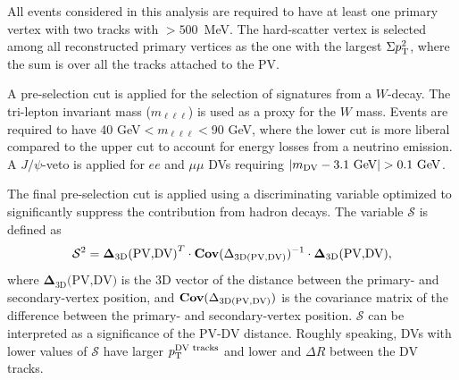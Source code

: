 All events considered in this analysis are required to have at least one primary vertex with two tracks with \pT$>500$~MeV. The hard-scatter vertex is selected among all reconstructed primary vertices as the one with the largest $\Sigma p_\mathrm{T}^2$, where the sum is over all the tracks attached to the PV.

A pre-selection cut is applied for the selection of signatures from a $W$-decay. The tri-lepton invariant mass ($m_{\ell\ell\ell}$) is used as a proxy for the $W$ mass. Events are required to have 40 GeV$<m_{\ell\ell\ell}<$90 GeV, where the lower cut is more liberal compared to the upper cut to account for energy losses from a neutrino emission. A $J/\psi$-veto is applied for $ee$ and $\mu\mu$ DVs requiring $|\mdv-3.1\text{ GeV}|>0.1\text{ GeV}$.

The final pre-selection cut is applied using a discriminating variable optimized to significantly suppress the contribution from hadron decays. The variable $\mathcal{S}$ is defined as
\begin{equation}
    \mathcal{S}^{2} = {\boldsymbol{\Delta}_{\text{3D}}\text{(PV,DV)}}^T \cdot  {\text{\textbf{Cov}}(\Delta_{\text{3D}(\text{PV,DV})})^{-1}} \cdot {\boldsymbol{\Delta}_{\text{3D}}\text{(PV,DV)}},
\end{equation}
where $\boldsymbol{\Delta}_{\text{3D}}\text{(PV,DV)}$ is the 3D vector of the distance between the primary- and secondary-vertex position, and $\text{\textbf{Cov}}(\Delta_{\text{3D}(\text{PV,DV})})$ is the covariance matrix of the difference between the primary- and secondary-vertex position. $\mathcal{S}$ can be interpreted as a significance of the PV-DV distance. 
Roughly speaking, DVs with lower values of $\mathcal{S}$ have larger $p_\mathrm{T}^\text{DV tracks}$ and lower \rdv and $\Delta R$ between the DV tracks.
 
